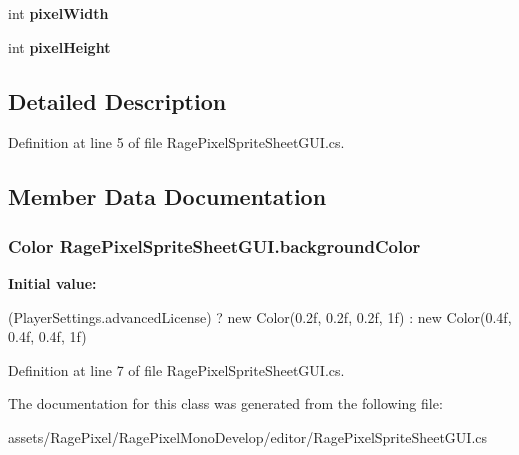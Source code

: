 \begin{DoxyCompactItemize}
\item 
\hypertarget{class_rage_pixel_sprite_sheet_g_u_i_a68722f6143d204cb847f5ebfe5b9d300}{int {\bfseries pixel\-Width}}\label{class_rage_pixel_sprite_sheet_g_u_i_a68722f6143d204cb847f5ebfe5b9d300}

\item 
\hypertarget{class_rage_pixel_sprite_sheet_g_u_i_a0d2cffc3f19d711765bdd72986df5f32}{int {\bfseries pixel\-Height}}\label{class_rage_pixel_sprite_sheet_g_u_i_a0d2cffc3f19d711765bdd72986df5f32}

\end{DoxyCompactItemize}


\subsection{Detailed Description}


Definition at line 5 of file Rage\-Pixel\-Sprite\-Sheet\-G\-U\-I.\-cs.



\subsection{Member Data Documentation}
\hypertarget{class_rage_pixel_sprite_sheet_g_u_i_ac8580d61bb9e9ac42e6a4d37b270796a}{
\subsubsection[{background\-Color}]{\setlength{\rightskip}{0pt plus 5cm}Color Rage\-Pixel\-Sprite\-Sheet\-G\-U\-I.\-background\-Color}}\label{class_rage_pixel_sprite_sheet_g_u_i_ac8580d61bb9e9ac42e6a4d37b270796a}
{\bfseries Initial value\-:}
\begin{DoxyCode}

                (PlayerSettings.advancedLicense) ?
                new Color(0.2f, 0.2f, 0.2f, 1f) :
                new Color(0.4f, 0.4f, 0.4f, 1f)
\end{DoxyCode}


Definition at line 7 of file Rage\-Pixel\-Sprite\-Sheet\-G\-U\-I.\-cs.



The documentation for this class was generated from the following file\-:\begin{DoxyCompactItemize}
\item 
assets/\-Rage\-Pixel/\-Rage\-Pixel\-Mono\-Develop/editor/Rage\-Pixel\-Sprite\-Sheet\-G\-U\-I.\-cs\end{DoxyCompactItemize}
